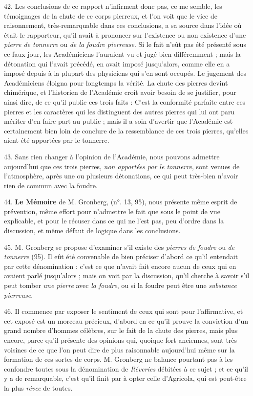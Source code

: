 \documentclass[a4paper, 11pt, oneside, polutonikogreek, french]{article}
\begin{document}
42. Les conclusions de ce rapport n'infirment donc pas, ce me semble, les témoignages de la chute de ce corps pierreux, et l'on voit que le vice de raisonnement, très-remarquable dans ces conclusions, a sa source dans l'idée où était le rapporteur, qu'il avait à prononcer sur l'existence ou non existence d'une \emph{pierre de tonnerre} ou \emph{de la foudre pierreuse}. Si le fait n'eût pas été présenté sous ce faux jour, les Académiciens l'auraient vu et jugé bien différemment ; mais la détonation qui l'avait précédé, en avait imposé jusqu'alors, comme elle en a imposé depuis à la plupart des physiciens qui s'en sont occupés. Le jugement des Académiciens éloigna pour longtemps la vérité. La chute des pierres devint chimérique, et l'historien de l'Académie croit avoir besoin de se justifier, pour ainsi dire, de ce qu'il publie ces trois faits : C'est la conformité parfaite entre ces pierres et les caractères qui les distinguent des autres pierres qui lui ont paru mériter d'en faire part au public ; mais il a soin d'avertir \og que l'Académie est certainement bien loin de conclure de la ressemblance de ces trois pierres, qu'elles aient été apportées par le tonnerre. \fg

43. Sans rien changer à l'opinion de l'Académie, nous pouvons admettre aujourd’hui que ces trois pierres, \emph{non apportées par le tonnerre}, sont venues de l'atmosphère, après une ou plusieurs détonations, ce qui peut très-bien n'avoir rien de commun avec la foudre.

44. \textbf{Le Mémoire} de M. Gronberg, (n°. 13, 95), nous présente même esprit de prévention, même effort pour n'admettre le fait que sous le point de vue explicable, et pour le récuser dans ce qui ne l'est pas, peu d'ordre dans la discussion, et même défaut de logique dans les conclusions.

45. M. Gronberg se propose d'examiner s'il existe des \emph{pierres de foudre} ou \emph{de tonnerre} (95). Il eût été convenable de bien préciser d'abord ce qu'il entendait par cette dénomination : c'est ce que n'avait fait encore aucun de ceux qui en avaient parlé jusqu'alors ; mais on voit par la discussion, qu'il cherche à savoir s'il peut tomber \emph{une pierre} avec \emph{la foudre}, ou si la foudre peut être une \emph{substance pierreuse}.

46. Il commence par exposer le sentiment de ceux qui sont pour l'affirmative, et cet exposé est un morceau précieux, d'abord en ce qu'il prouve la conviction d'un grand nombre d'hommes célèbres, sur le fait de la chute des pierres, mais plus encore, parce qu'il présente des opinions qui, quoique fort anciennes, sont très-voisines de ce que l'on peut dire de plus raisonnable aujourd'hui même sur la formation de ces sortes de corps. M. Gronberg ne balance pourtant pas à les confondre toutes sous la dénomination de \emph{Réveries} débitées à ce sujet ; et ce qu'il y a de remarquable, c'est qu'il finit par à opter celle d'Agricola, qui est peut-être la plus \emph{révee} de toutes.
\end{document}
